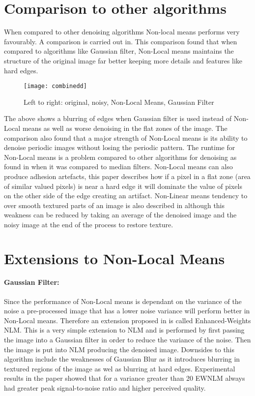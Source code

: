 \documentclass[11pt,letterpaper]{article}
\begin{document}
\section*{Comparison to other algorithms}
When compared to other denoising algorithms Non-local means performs very favourably. A comparison is carried out in\cite{paper3}. This comparison found that when compared to algorithms like Gaussian filter, Non-Local means maintains the structure of the original image far better keeping more details and features like hard edges.
\begin{figure}[H]
\centering
\texttt{[image: combinedd]}
\caption{Left to right: original, noisy, Non-Local Means, Gaussian Filter}
\end{figure}
The above shows a blurring of edges when Gaussian filter is used instead of Non-Local means as well as worse denoising in the flat zones of the image.
The comparison\cite{paper3} also found that a major strength of Non-Local means is its ability to denoise periodic images without losing the periodic pattern. The runtime for Non-Local means is a problem compared to other algorithms for denoising as found in\cite{paper4} when it was compared to median filters. Non-Local means can also produce adhesion artefacts\cite{paper5}, this paper describes how if a pixel in a flat zone (area of similar valued pixels) is near a hard edge it will dominate the value of pixels on the other side of the edge creating an artifact. Non-Linear means tendency to over smooth textured parts of an image is also described in \cite{paper5} although this weakness can be reduced by taking an average of the denoised image and the noisy image at the end of the process to restore texture\cite{paper5}.

\section*{Extensions to Non-Local Means}
\paragraph{Gaussian Filter:}
Since the performance of Non-Local means is dependant on the variance of the noise \cite{paper7} a pre-processed image that has a lower noise variance will perform better in Non-Local means. Therefore an extension proposed in \cite{paper7} is called Enhanced-Weights NLM. This is a very simple extension to NLM and is performed by first passing the image into a Gaussian filter in order to reduce the variance of the noise. Then the image is put into NLM producing the denoised image. Downsides to this algorithm include the weaknesses of Gaussian Blur as it introduces blurring in textured regions of the image as wel as blurring at hard edges\cite{paper7}. Experimental results in the paper showed that for a variance greater than 20 EWNLM always had greater peak signal-to-noise ratio and higher perceived quality\cite{paper7}.
\end{document}

